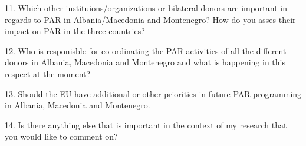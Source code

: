 11. Which other instituions/organizations or bilateral donors are important in regards to PAR in Albania/Macedonia and Montenegro? How do you asses their impact on PAR in the three countries? 

12. Who is responisble for co-ordinating the PAR activities of all the different donors in Albania, Macedonia and Montenegro and what is happening in this respect at the moment? 

13. Should the EU have additional or other priorities in future PAR programming in Albania, Macedonia and Montenegro. 

14. Is there anything else that is important in the context of my research that you would like to comment on?